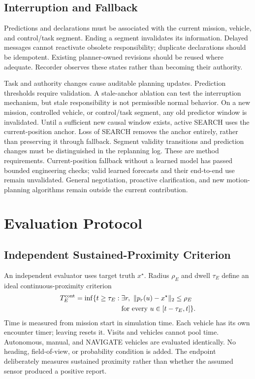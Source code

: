 \documentclass[conference]{IEEEtran}
\begin{document}
\subsection{Interruption and Fallback}
Predictions and declarations must be associated with the current mission, vehicle, and control/task segment. Ending a segment invalidates its information. Delayed messages cannot reactivate obsolete responsibility; duplicate declarations should be idempotent. Existing planner-owned revisions should be reused where adequate. Recorder observes these states rather than becoming their authority.

Task and authority changes cause auditable planning updates. Prediction thresholds require validation. A stale-anchor ablation can test the interruption mechanism, but stale responsibility is not permissible normal behavior. On a new mission, controlled vehicle, or control/task segment, any old predictor window is invalidated. Until a sufficient new causal window exists, active SEARCH uses the current-position anchor. Loss of SEARCH removes the anchor entirely, rather than preserving it through fallback. Segment validity transitions and prediction changes must be distinguished in the replanning log. These are method requirements. Current-position fallback without a learned model has passed bounded engineering checks; valid learned forecasts and their end-to-end use remain unvalidated. General negotiation, proactive clarification, and new motion-planning algorithms remain outside the current contribution.

\section{Evaluation Protocol}
\subsection{Independent Sustained-Proximity Criterion}
An independent evaluator uses target truth $x^\star$. Radius $\rho_E$ and dwell $\tau_E$ define an ideal continuous-proximity criterion
\begin{equation}
\begin{split}
 T_E^{\rm cont}=\inf\{t\geq\tau_E:\;&\exists r,\ \|p_r(u)-x^\star\|_2\leq\rho_E\\
 &\text{for every }u\in[t-\tau_E,t]\}.
\end{split}
\label{eq:event}
\end{equation}
Time is measured from mission start in simulation time. Each vehicle has its own encounter timer; leaving resets it. Visits and vehicles cannot pool time. Autonomous, manual, and NAVIGATE vehicles are evaluated identically. No heading, field-of-view, or probability condition is added. The endpoint deliberately measures sustained proximity rather than whether the assumed sensor produced a positive report.
\end{document}
